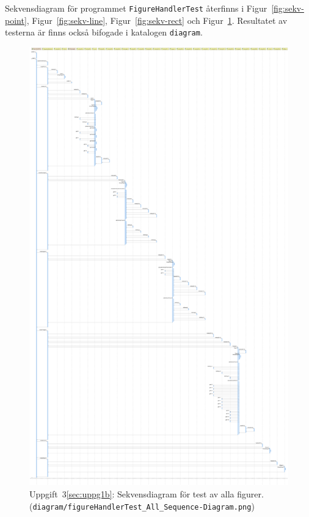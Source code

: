 Sekvensdiagram för programmet \texttt{FigureHandlerTest} återfinns i
Figur~\ref{fig:sekv-point}, Figur~\ref{fig:sekv-line},
Figur~\ref{fig:sekv-rect} och Figur~\ref{fig:sekv-all}.
Resultatet av testerna är finns också bifogade i katalogen \texttt{diagram}.



\begin{figure}[ht]
\centering
\includegraphics[width=0.9\linewidth]{diagram/figureHandlerTest_All_Sequence-Diagram.png}
\caption{Uppgift~3\ref{sec:uppg1b}: Sekvensdiagram för test av alla figurer.
\\ (\texttt{diagram/figureHandlerTest\_All\_Sequence-Diagram.png})}
\label{fig:sekv-all}
\end{figure}

